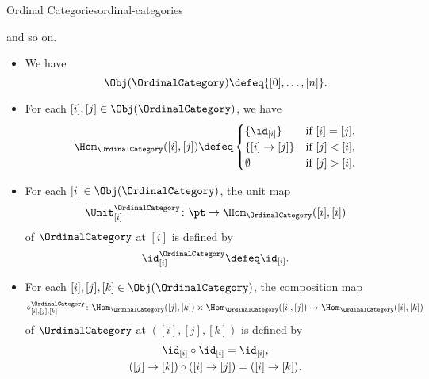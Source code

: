 \begin{example}{Ordinal Categories}{ordinal-categories}
{        and so on.
        \par\vspace*{\TCBBoxCorrection}
    }%
    \begin{itemize}
        \item{}We have
            \[
                \Obj(\OrdinalCategory)
                \defeq
                \{[0],\ldots,[n]\}.
            \]%
        \item{}For each $[i],[j]\in\Obj(\OrdinalCategory)$, we have
            \[
                \Hom_{\OrdinalCategory}([i],[j])
                \defeq
                \begin{cases}
                    \{\id_{[i]}\}                &\text{if $[i]=[j]$,}\\
                    \{[i]\to[j]\}    &\text{if $[j]<[i]$,}\\
                    \emptyset                    &\text{if $[j]>[i]$.}
                \end{cases}
            \]%
        \item{}For each $[i]\in\Obj(\OrdinalCategory)$, the unit map
            \[
                \Unit^{\OrdinalCategory}_{[i]}
                \colon
                \pt
                \to
                \Hom_{\OrdinalCategory}([i],[i])
            \]%
            of $\OrdinalCategory$ at $[i]$ is defined by
            \[
                \id^{\OrdinalCategory}_{[i]}
                \defeq
                \id_{[i]}.
            \]%
        \item{}For each $[i],[j],[k]\in\Obj(\OrdinalCategory)$, the composition map
            \[
                \circ^{\OrdinalCategory}_{[i],[j],[k]}
                \colon
                \Hom_{\OrdinalCategory}([j],[k])
                \times
                \Hom_{\OrdinalCategory}([i],[j])
                \to
                \Hom_{\OrdinalCategory}([i],[k])
            \]%
            of $\OrdinalCategory$ at $([i],[j],[k])$ is defined by%
            \[
                \begin{gathered}
                    \id_{[i]}\circ\id_{[i]}                             = \id_{[i]},\\%
                    ([j]\to[k])\circ([i]\to[j]) = ([i]\to[k]).%
                \end{gathered}
            \]%
    \end{itemize}
\end{example}
